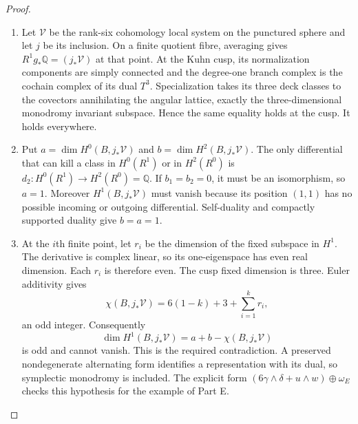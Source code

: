 \begin{proof}
\begin{enumerate}[label=\arabic*.]
\item Let $\mathcal V$ be the rank-six cohomology local system on
the punctured sphere and let $j$ be its inclusion.  On a finite
quotient fibre, averaging gives $R^1g_*\mathbb Q=(j_*\mathcal V)$
at that point.  At the Kuhn cusp, its normalization components
are simply connected and the degree-one branch complex is
the cochain complex of its dual $T^3$.  Specialization takes
its three deck classes to the covectors annihilating the
angular lattice, exactly the three-dimensional monodromy
invariant subspace.  Hence the same equality holds at the cusp.
It holds everywhere.

\item Put $a=\dim H^0(B,j_*\mathcal V)$ and
$b=\dim H^2(B,j_*\mathcal V)$.  The only differential that
can kill a class in $H^0(R^1)$ or in $H^2(R^0)$ is
$d_2:H^0(R^1)\to H^2(R^0)=\mathbb Q$.  If $b_1=b_2=0$,
it must be an isomorphism, so $a=1$.  Moreover
$H^1(B,j_*\mathcal V)$ must vanish because its position
$(1,1)$ has no possible incoming or outgoing differential.
Self-duality and compactly supported duality give $b=a=1$.

\item At the $i$th finite point, let $r_i$ be the dimension of the
fixed subspace in $H^1$.  The derivative is complex linear,
so its one-eigenspace has even real dimension.  Each $r_i$
is therefore even.  The cusp fixed dimension is three.
Euler additivity gives
\[
 \chi(B,j_*\mathcal V)=6(1-k)+3+\sum_{i=1}^k r_i,
\]
an odd integer.  Consequently
\[
 \dim H^1(B,j_*\mathcal V)=a+b-\chi(B,j_*\mathcal V)
\]
is odd and cannot vanish.  This is the required contradiction.
A preserved nondegenerate alternating form identifies a
representation with its dual, so symplectic monodromy is
included.  The explicit form
$(6\gamma\wedge\delta+u\wedge w)\oplus\omega_E$
checks this hypothesis for the example of Part E.

\end{enumerate}
\end{proof}





